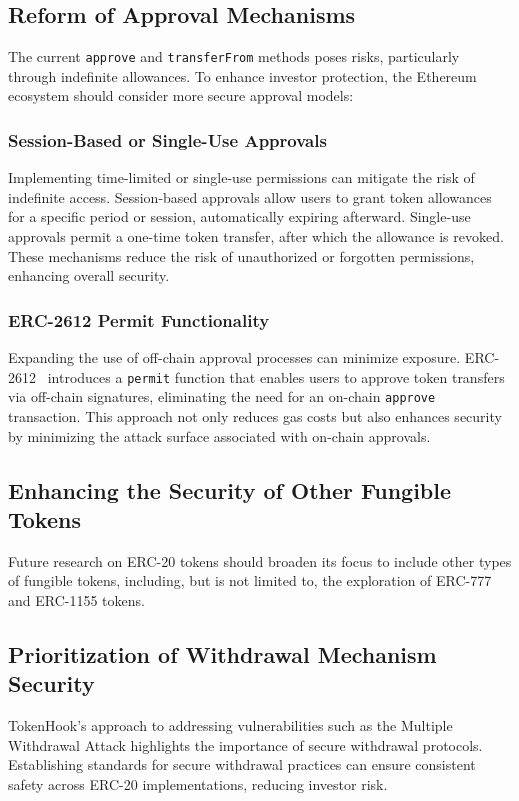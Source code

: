 \subsection{Reform of Approval Mechanisms}
The current \texttt{approve} and \texttt{transferFrom} methods poses risks, particularly through indefinite allowances. To enhance investor protection, the Ethereum ecosystem should consider more secure approval models:

\subsubsection{Session-Based or Single-Use Approvals}
Implementing time-limited or single-use permissions can mitigate the risk of indefinite access. Session-based approvals allow users to grant token allowances for a specific period or session, automatically expiring afterward. Single-use approvals permit a one-time token transfer, after which the allowance is revoked. These mechanisms reduce the risk of unauthorized or forgotten permissions, enhancing overall security.

\subsubsection{ERC-2612 Permit Functionality}
Expanding the use of off-chain approval processes can minimize exposure. ERC-2612~\cite{eip2612} introduces a \texttt{permit} function that enables users to approve token transfers via off-chain signatures, eliminating the need for an on-chain \texttt{approve} transaction. This approach not only reduces gas costs but also enhances security by minimizing the attack surface associated with on-chain approvals.

\subsection{Enhancing the Security of Other Fungible Tokens}
Future research on ERC-20 tokens should broaden its focus to include other types of fungible tokens, including, but is not limited to, the exploration of ERC-777 and ERC-1155 tokens.

\subsection{Prioritization of Withdrawal Mechanism Security}
TokenHook's approach to addressing vulnerabilities such as the Multiple Withdrawal Attack highlights the importance of secure withdrawal protocols. Establishing standards for secure withdrawal practices can ensure consistent safety across ERC-20 implementations, reducing investor risk.

